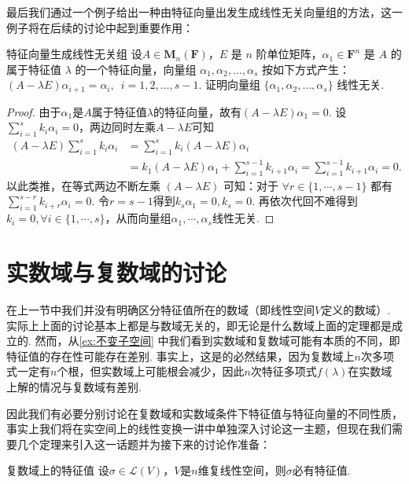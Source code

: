 最后我们通过一个例子给出一种由特征向量出发生成线性无关向量组的方法，这一例子将在后续的讨论中起到重要作用：
\begin{example}{}{特征向量生成线性无关组}
    设$A\in \mathbf{M}_n(\mathbf{F})$，$E$ 是 $n$ 阶单位矩阵，$\alpha_1 \in \mathbf{F}^n$ 是 $A$ 的属于特征值 $\lambda$ 的一个特征向量，向量组 $\alpha_1,\alpha_2,\ldots,\alpha_s$ 按如下方式产生：$(A-\lambda E)\alpha_{i+1}=\alpha_i,\enspace i=1,2,\ldots,s-1$. 证明向量组 $\{\alpha_1,\alpha_2,\ldots,\alpha_s\}$ 线性无关.
\end{example}

\begin{proof}
    由于$\alpha_1$是$A$属于特征值$\lambda$的特征向量，故有$(A-\lambda E)\alpha_1=0$. 设$\displaystyle\sum_{i=1}^{s}k_i\alpha_i=0$，两边同时左乘$A-\lambda E$可知
    \begin{align*}
        (A-\lambda E)\displaystyle\sum_{i=1}^{s}k_i\alpha_i &= \displaystyle\sum_{i=1}^{s}k_i(A-\lambda E)\alpha_i \\
        &= k_1(A-\lambda E)\alpha_1+\displaystyle\sum_{i=1}^{s-1}k_{i+1}\alpha_i=\displaystyle\sum_{i=1}^{s-1}k_{i+1}\alpha_i=0.
    \end{align*}
    以此类推，在等式两边不断左乘 $(A-\lambda E)$ 可知：对于 $\forall r \in \{1,\cdots,s-1\}$ 都有 $\displaystyle\sum_{i=1}^{s-r}k_{i+r}\alpha_i=0$. 令$r=s-1$得到$k_s\alpha_1=0,k_s=0$. 再依次代回不难得到$k_i=0,\forall i \in \{1,\cdots,s\}$，从而向量组$\alpha_1,\cdots,\alpha_s$线性无关.
\end{proof}

\section{实数域与复数域的讨论}

在上一节中我们并没有明确区分特征值所在的数域（即线性空间$V$定义的数域）. 实际上上面的讨论基本上都是与数域无关的，即无论是什么数域上面的定理都是成立的. 然而，从\autoref{ex:不变子空间} 中我们看到实数域和复数域可能有本质的不同，即特征值的存在性可能存在差别. 事实上，这是的必然结果，因为复数域上$n$次多项式一定有$n$个根，但实数域上可能根会减少，因此$n$次特征多项式$f(\lambda)$在实数域上解的情况与复数域有差别.

因此我们有必要分别讨论在复数域和实数域条件下特征值与特征向量的不同性质，事实上我们将在实空间上的线性变换一讲中单独深入讨论这一主题，但现在我们需要几个定理来引入这一话题并为接下来的讨论作准备：
\begin{theorem}{}{复数域上的特征值}
    设$\sigma\in \mathcal{L}(V)$，$V$是$n$维复线性空间，则$\sigma$必有特征值.
\end{theorem}

